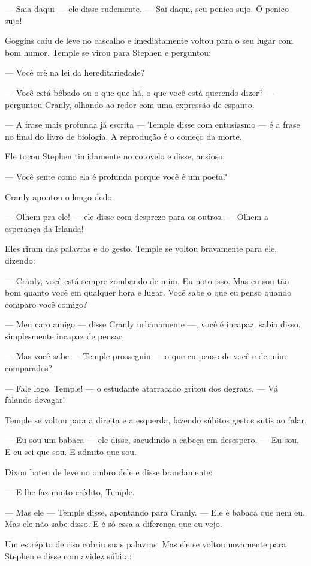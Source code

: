  --- Saia daqui --- ele disse rudemente. --- Sai daqui, seu penico sujo. Ô penico
sujo!

Goggins caiu de leve no cascalho e imediatamente voltou para o seu lugar
com bom humor. Temple se virou para Stephen e perguntou:

 --- Você crê na lei da hereditariedade?

 --- Você está bêbado ou o que que há, o que você está querendo dizer? --- perguntou Cranly, olhando ao redor com uma expressão de espanto.

 --- A frase mais profunda já escrita --- Temple disse com entusiasmo --- é a
frase no final do livro de biologia. A reprodução é o começo da morte.

Ele tocou Stephen timidamente no cotovelo e disse, ansioso:

 --- Você sente como ela é profunda porque você é um poeta?

Cranly apontou o longo dedo.

 --- Olhem pra ele! --- ele disse com desprezo para os outros. --- Olhem a
esperança da Irlanda!

Eles riram das palavras e do gesto. Temple se voltou bravamente para
ele, dizendo:

--- Cranly, você está sempre zombando de mim. Eu noto isso. Mas eu sou tão
bom quanto você em qualquer hora e lugar. Você sabe o que eu penso
quando comparo você comigo?

 --- Meu caro amigo --- disse Cranly urbanamente ---, você é incapaz, sabia disso,
simplesmente incapaz de pensar.

 --- Mas você sabe --- Temple prosseguiu --- o que eu penso de você e de mim
comparados?

 --- Fale logo, Temple! --- o estudante atarracado gritou dos degraus. --- Vá
falando devagar!

Temple se voltou para a direita e a esquerda, fazendo súbitos gestos
sutis ao falar.

--- Eu sou um babaca --- ele disse, sacudindo a cabeça em desespero. --- Eu sou. E eu
sei que sou. E admito que sou.

Dixon bateu de leve no ombro dele e disse brandamente:

 --- E lhe faz muito crédito, Temple.

 --- Mas ele --- Temple disse, apontando para Cranly. --- Ele é babaca que nem
eu. Mas ele não sabe disso. E é só essa a diferença que eu vejo.

Um estrépito de riso cobriu suas palavras. Mas ele se voltou novamente
para Stephen e disse com avidez súbita:

